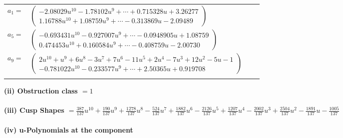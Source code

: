\documentclass[1p]{elsarticle_modified}
\theoremstyle{definition}
\begin{document}
\begin{tabular}{m{7pt} m{180pt} m{7pt} m{180pt} }
\flushright $a_{1}=$&$\begin{pmatrix}-2.08029 u^{10}-1.78102 u^{9}+\cdots+0.715328 u+3.26277\\1.16788 u^{10}+1.08759 u^{9}+\cdots-0.313869 u-2.09489\end{pmatrix}$ \\
\flushright $a_{5}=$&$\begin{pmatrix}-0.693431 u^{10}-0.927007 u^{9}+\cdots-0.0948905 u+1.08759\\0.474453 u^{10}+0.160584 u^{9}+\cdots-0.408759 u-2.00730\end{pmatrix}$ \\
\flushright $a_{9}=$&$\begin{pmatrix}2 u^{10}+u^9+6 u^8-3 u^7+7 u^6-11 u^5+2 u^4-7 u^3+12 u^2-5 u-1\\-0.781022 u^{10}-0.233577 u^{9}+\cdots+2.50365 u+0.919708\end{pmatrix}$\\&\end{tabular}
\flushleft \textbf{(ii) Obstruction class $= 1$}\\~\\
\flushleft \textbf{(iii) Cusp Shapes $= \frac{387}{137} u^{10}+\frac{190}{137} u^9+\frac{1278}{137} u^8-\frac{524}{137} u^7+\frac{1882}{137} u^6-\frac{2126}{137} u^5+\frac{1207}{137} u^4-\frac{2002}{137} u^3+\frac{2504}{137} u^2-\frac{1891}{137} u-\frac{1005}{137}$}\\~\\
\newpage\renewcommand{\arraystretch}{1}
\flushleft \textbf{(iv) u-Polynomials at the component}\newline \\
\end{document}
